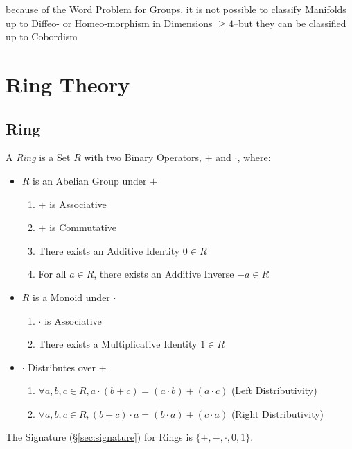 because of the Word Problem for Groups, it is not possible to classify
Manifolds up to Diffeo- or Homeo-morphism in Dimensions $\geq 4$--but they can
be classified up to Cobordism




\section{Ring Theory}\label{sec:ring_theory}

\subsection{Ring}\label{sec:ring}

A \emph{Ring} is a Set $R$ with two Binary Operators, $+$ and $\cdot$, where:
\begin{itemize}
\item $R$ is an Abelian Group under $+$
    \begin{enumerate}
        \item $+$ is Associative
        \item $+$ is Commutative
        \item There exists an Additive Identity $0 \in R$
        \item For all $a \in R$, there exists an Additive Inverse $-a
          \in R$
    \end{enumerate}
\item $R$ is a Monoid under $\cdot$
    \begin{enumerate}
        \item $\cdot$ is Associative
        \item There exists a Multiplicative Identity $1 \in R$
    \end{enumerate}
\item $\cdot$ Distributes over $+$
    \begin{enumerate}
        \item $\forall a,b,c \in R,
            a \cdot (b + c) = (a \cdot b) + (a \cdot c)$
            (Left Distributivity)
        \item $\forall a,b,c \in R,
            (b + c) \cdot a = (b \cdot a) + (c \cdot a)$
            (Right Distributivity)
    \end{enumerate}
\end{itemize}
The Signature (\S\ref{sec:signature}) for Rings is $\{+, -, \cdot, 0, 1\}$.

